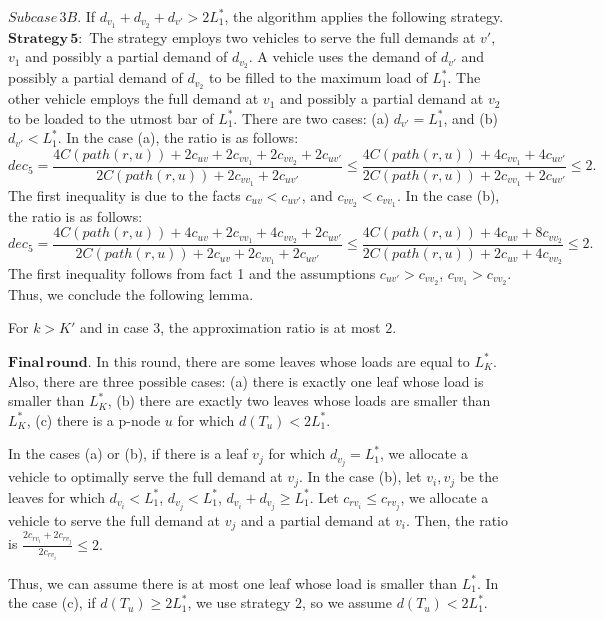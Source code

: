 \indent $Subcase \,3B.$ If $d_{v_1}+d_{v_2}+d_{v'} > 2L_1^*$, the algorithm applies the following strategy. \\
\indent $\mathbf{Strategy \, 5}:$ The strategy employs two vehicles to serve the full demands at $v'$, $v_1$ and possibly a partial demand of $d_{v_2}$. A vehicle uses the demand of $d_{v'}$ and possibly a partial demand of $d_{v_2}$ to be filled to the maximum load of $L_1^*$. The other vehicle employs the full demand at $v_1$ and possibly a partial demand at $v_2$ to be loaded to the utmost bar of $L_1^*$. There are two cases: (a) $d_{v'}=L_1^*$, and (b) $d_{v'}<L_1^*$. In the case (a), the ratio is as follows:
$$dec_5=\frac{4C(path(r,u))+2c_{uv}+2c_{vv_1}+2c_{vv_2}+2c_{uv'}}{2C(path(r,u))+2c_{vv_1}+2c_{uv'}} \le \frac{4C(path(r,u))+4c_{vv_1}+4c_{uv'}}{2C(path(r,u))+2c_{vv_1}+2c_{uv'}} \le 2.$$
\noindent The first inequality is due to the facts $c_{uv} < c_{uv'}$, and $c_{vv_2} < c_{vv_1}$. In the case (b), the ratio is as follows:
$$dec_5 =\frac{4C(path(r,u))+4c_{uv}+2c_{vv_1}+4c_{vv_2}+2c_{uv'}}{2C(path(r,u))+2c_{uv}+2c_{vv_1}+2c_{uv'}} \le \frac{4C(path(r,u))+4c_{uv}+8c_{vv_2}}{2C(path(r,u))+2c_{uv}+4c_{vv_2}} \le 2.$$
\noindent The first inequality follows from fact 1 and the assumptions $c_{uv'} > c_{vv_2} $, $ c_{vv_1}> c_{vv_2} $. Thus, we conclude the following lemma.
\begin{lemma}
For $k > K'$ and in case 3, the approximation ratio is at most $2$.
\end{lemma}

\indent $\mathbf{Final \, round}.$ In this round, there are some leaves whose loads are equal to $L_K^*$. Also, there are three possible cases: (a) there is exactly one leaf whose load is smaller than $L_K^*$, (b) there are exactly two leaves whose loads are smaller than $L_K^*$, (c) there is a p-node $u$ for which $d(T_u) < 2L_1^*$.

\indent In the cases (a) or (b), if there is a leaf $v_j$ for which $d_{v_j}=L_1^*$, we allocate a vehicle to optimally serve the full demand at $v_j$. In the case (b), let $v_i, v_j$ be the leaves for which $d_{v_i} <L_1^*$, $d_{v_j} <L_1^*$, $d_{v_i} +d_{v_j} \ge L_1^*$. Let $c_{rv_i} \le c_{rv_j}$, we allocate a vehicle to serve the full demand at $v_j$ and a partial demand at $v_i$. Then, the ratio is  
$\frac{2c_{rv_i}+2c_{rv_j}}{2c_{rv_i}} \le 2.$

\indent Thus, we can assume there is at most one leaf whose load is smaller than $L_1^*$. In the case (c), if $d(T_u) \ge 2L_1^*$, we use strategy $2$, so we assume $d(T_u) < 2L_1^*$. 

